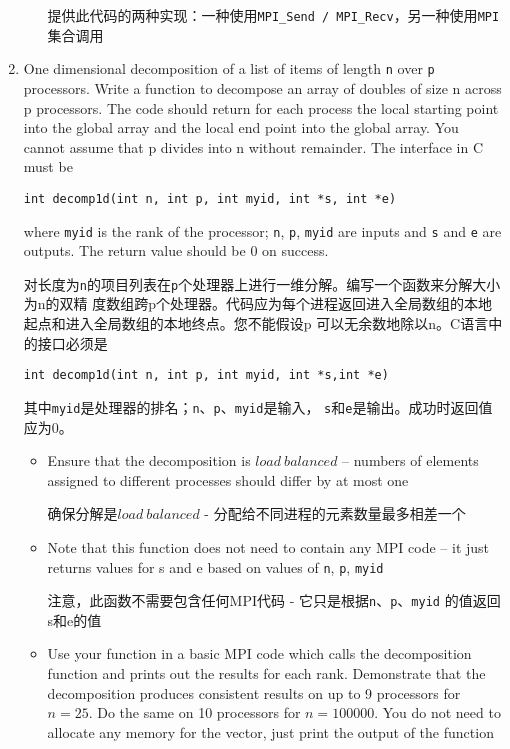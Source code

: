 \documentclass{article}
\begin{document}
\begin{enumerate}
\begin{itemize}
        提供此代码的两种实现：一种使用\texttt{MPI\_Send / MPI\_Recv}，另一种使用\texttt{MPI}集合调用
    \end{itemize}

    \newpage
    \item One dimensional decomposition of a list of items of length \texttt{n} over 
    \texttt{p} processors. Write a function to decompose an array of doubles of size 
    n across p processors. The code should return for each process the local starting 
    point into the global array and the local end point into the global array. You 
    cannot assume that p divides into n without remainder. The interface in C must be

    \hspace*{3em}\texttt{int decomp1d(int n, int p, int myid, int *s, int *e)} 
    
    where \texttt{myid} 
    is the rank of the processor; \texttt{n}, \texttt{p}, \texttt{myid} are inputs and 
    \texttt{s} and \texttt{e} are outputs. The return value should be 0 on success.
    
    对长度为\texttt{n}的项目列表在\texttt{p}个处理器上进行一维分解。编写一个函数来分解大小为n的双精
    度数组跨p个处理器。代码应为每个进程返回进入全局数组的本地起点和进入全局数组的本地终点。您不能假设p
    可以无余数地除以n。C语言中的接口必须是
    
    \hspace*{3em}\texttt{int decomp1d(int n, int p, int myid, int *s,int *e)}
     
     其中\texttt{myid}是处理器的排名；\texttt{n}、\texttt{p}、\texttt{myid}是输入，
     \texttt{s}和\texttt{e}是输出。成功时返回值应为0。

    \begin{itemize}
        \item Ensure that the decomposition is $load\:balanced$ – numbers of elements 
        assigned to different processes should differ by at most one

        确保分解是$load\:balanced$ - 分配给不同进程的元素数量最多相差一个
        \item Note that this function does not need to contain any MPI code – it 
        just returns values for s and e based on values of \texttt{n}, \texttt{p},
        \texttt{myid}

        注意，此函数不需要包含任何MPI代码 - 它只是根据\texttt{n}、\texttt{p}、\texttt{myid}
        的值返回s和e的值
        \item Use your function in a basic MPI code which calls the decomposition 
        function and prints out the results for each rank. Demonstrate that the 
        decomposition produces consistent results on up to 9 processors for $n = 25$. 
        Do the same on 10 processors for $n = 100000$. You do not need to allocate 
        any memory for the vector, just print the output of the function
        

\end{itemize}
\end{enumerate}
\end{document}
